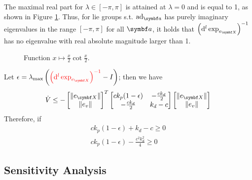 The maximal real part for $\lambda \in [-\pi, \pi]$ is attained at $\lambda = 0$ and is equal to 1, as shown in Figure \ref{fig:cot_fcn}. Thus, for lie groups s.t. $\ad_\a$ has purely imaginary eigenvalues in the range $[-\pi, \pi]$ for all $\a$, it holds that $\left( \mathrm{d}^l \exp_{e_\X} \right)^{-1}$ has no eigenvalue with real absolute magnitude larger than 1.

\begin{figure}
  \begin{center}
  \end{center}
  \caption{Function $x \mapsto \frac{x}{2} \cot \frac{x}{2}$.}
  \label{fig:cot_fcn}
\end{figure}

Let $\epsilon = \lambda_\textrm{max} \left( \textcolor{red}{\left(\mathrm{d}^l \exp_{e_\X} \right)^{-1}} - I \right)$; then we have
\begin{equation}
  \dot V \leq -\begin{bmatrix} \| e_\X \| \\ \| e_v \| \end{bmatrix}^T \begin{bmatrix} c k_p (1 - \epsilon) & -\frac{c k_d}{2} \\ -\frac{c k_d}{2} & k_d - c \end{bmatrix} \begin{bmatrix} \| e_\X \| \\ \| e_v \| \end{bmatrix}
\end{equation}
Therefore, if
\begin{equation}
  \begin{aligned}
    c k_p (1 - \epsilon) + k_d - c \geq 0 \\
    c k_p (1 - \epsilon) - \frac{c^2 k_d^2}{4}  \geq 0
  \end{aligned}
\end{equation}


\subsection{Sensitivity Analysis}

